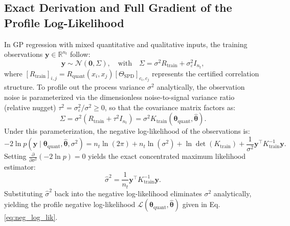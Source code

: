 \documentclass[default,sn-mathphys,Numbered]{sn-jnl}
\theoremstyle{thmstyleone}
\theoremstyle{thmstylethree}
\theoremstyle{thmstyletwo}
\newcommand{\eqnref}[1]{\eqref{#1}}
\begin{document}
\begin{appendices}
\subsection{Exact Derivation and Full Gradient of the Profile Log-Likelihood}
\label{subsec:full_mle_gradient}
In GP regression with mixed quantitative and qualitative inputs, the training observations $\bm{y} \in \mathbb{R}^{n_t}$ follow:
\begin{equation}
\bm{y} \sim \mathcal{N}\left(\bm{0}, \Sigma\right), \quad \text{with} \quad \Sigma = \sigma^2 R_{\mathrm{train}} + \sigma_\varepsilon^2 I_{n_t},
\end{equation}
where $[R_{\mathrm{train}}]_{i, j} = R_{\mathrm{quant}}(x_i, x_j) [\Theta_{\mathrm{SPD}}]_{c_i, c_j}$ represents the certified correlation structure. To profile out the process variance $\sigma^2$ analytically, the observation noise is parameterized via the dimensionless noise-to-signal variance ratio (relative nugget) $\tau^2 = \sigma_\varepsilon^2 / \sigma^2 \ge 0$, so that the covariance matrix factors as:
\begin{equation}
\Sigma = \sigma^2 \left( R_{\mathrm{train}} + \tau^2 I_{n_t} \right) = \sigma^2 K_{\mathrm{train}}(\bm{\theta}_{\mathrm{quant}}, \hat{\bm{\theta}}).
\end{equation}
Under this parameterization, the negative log-likelihood of the observations is:
\begin{equation}
-2 \ln p(\bm{y} \mid \bm{\theta}_{\mathrm{quant}}, \hat{\bm{\theta}}, \sigma^2) = n_t \ln(2\pi) + n_t \ln(\sigma^2) + \ln \det(K_{\mathrm{train}}) + \frac{1}{\sigma^2} \bm{y}^\top K_{\mathrm{train}}^{-1} \bm{y}.
\end{equation}
Setting $\frac{\partial}{\partial \sigma^2} (-2\ln p) = 0$ yields the exact concentrated maximum likelihood estimator:
\begin{equation}
\label{eq:sigma_hat_concentrated}
\hat{\sigma}^2 = \frac{1}{n_t} \bm{y}^\top K_{\mathrm{train}}^{-1} \bm{y}.
\end{equation}
Substituting $\hat{\sigma}^2$ back into the negative log-likelihood eliminates $\sigma^2$ analytically, yielding the profile negative log-likelihood $\mathcal{L}(\bm{\theta}_{\mathrm{quant}}, \hat{\bm{\theta}})$ given in Eq.\eqnref{eq:neg_log_lik}.


\end{appendices}
\end{document}
